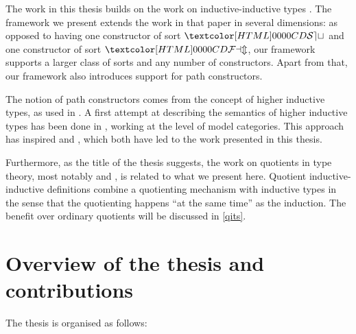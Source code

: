The work in this thesis builds on the work on inductive-inductive
types \cite{NordvallForsberg2013,Altenkirch2011}. The framework we
present extends the work in that paper in several dimensions: as
opposed to having one constructor of sort $\SET$ and one constructor
of sort $\FAM$, our framework supports a larger class of sorts and any
number of constructors. Apart from that, our framework also introduces
support for path constructors.

The notion of path constructors comes from the concept of higher
inductive types, as used in \cite{UFP2013}. A first attempt at
describing the semantics of higher inductive types has been done in
\cite{Lumsdaine2013}, working at the level of model categories. This
approach has inspired \cite{Capriotti2014ii} and
\cite{Altenkirch2015ii}, which both have led to the work presented in
this thesis.

Furthermore, as the title of the thesis suggests, the work on
quotients in type theory, most notably \cite{Nuo2015} and
\cite{Hofmann1995}, is related to what we present here. Quotient
inductive-inductive definitions combine a quotienting mechanism with
inductive types in the sense that the quotienting happens ``at the
same time'' as the induction. The benefit over ordinary quotients will
be discussed in \cref{qits}.

\section{Overview of the thesis and contributions}

The thesis is organised as follows:

